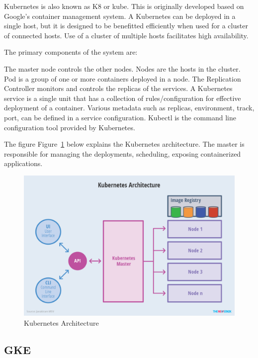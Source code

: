 Kubernetes is also known as K8 or kube. This is originally developed based on Google’s container 
management system. A Kubernetes can be deployed in a single host, but it is designed to be
benefitted efficiently when used for a cluster of connected hosts. Use of a cluster of 
multiple hosts facilitates high availability.


The primary components of the system are: 

The master node controls the other nodes. Nodes are the hosts in the cluster. Pod is a group 
of one or more containers deployed in a node.  The Replication Controller monitors and controls
the replicas of the services. A Kubernetes service is a single unit that has a collection of 
rules/configuration for effective deployment of a container. Various metadata such as replicas,
environment, track, port, can be defined in a service configuration. Kubectl is the command line 
configuration tool provided by Kubernetes. 

The figure Figure~\ref{fig:kube-archtecture} below explains the Kubernetes architecture. The
master is responsible for managing the 
deployments, scheduling, exposing containerized applications.

\begin{figure}[htb]
	\centering\includegraphics[width=\columnwidth]
        {images/hid_417_Kubernetes-Architecture}
	\caption{Kubernetes Architecture~\cite{hid-sp18-417-kubernetes}}\label{fig:kube-archtecture}
\end{figure}

\subsection{GKE}

